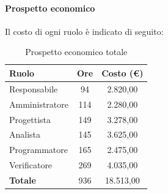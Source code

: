 \documentclass[../PianoDiProgetto_v3.0.0.tex]{subfiles}
\begin{document}
			\newpage
			\paragraph{Prospetto economico}
			Il costo di ogni ruolo è indicato di seguito:
			\begin{table}[h]
				\centering
				\begin{tabular}{l * {2}{c}}
				\toprule
				\textbf{Ruolo} & \textbf{Ore} & \textbf{Costo (\euro{})} \\
				\midrule
				Responsabile & 94 & 2.820,00 \\
				Amministratore & 114 & 2.280,00 \\
				Progettista & 149 & 3.278,00 \\
				Analista & 145 & 3.625,00 \\		
				Programmatore & 165 & 2.475,00 \\		
				Verificatore & 269 & 4.035,00 \\				
				\midrule		
				\textbf{Totale} & 936 & 18.513,00 \\
				\bottomrule	
				\end{tabular}
				\caption{Prospetto economico totale}		
			\end{table}
			
\end{document}

